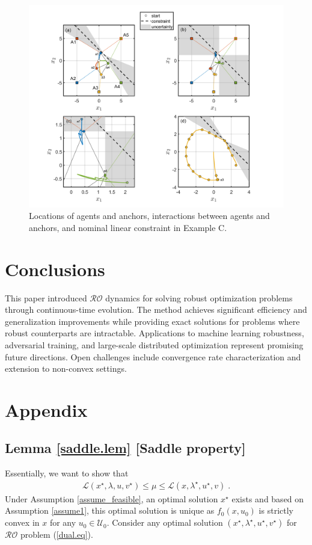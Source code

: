 \documentclass[journal,twoside,web]{ieeecolor}
\newcommand{\rev}[1]{\textcolor{revisionblue}{#1}}
\begin{document}
\begin{figure}
\begin{center}
\includegraphics[scale=0.26]{simulation_figure_finalv3.png}
\vspace{-1.5mm}
\caption{\rev{Locations of agents and anchors, interactions between agents and anchors, and nominal linear constraint in Example C.}}
\label{fig_points}
\end{center}
\end{figure}

\section{Conclusions}\label{section_conclusions}


\rev{This paper introduced $\mathcal{RO}$ dynamics for solving robust optimization problems through continuous-time evolution. The method achieves significant efficiency and generalization improvements while providing exact solutions for problems where robust counterparts are intractable. Applications to machine learning robustness, adversarial training, and large-scale distributed optimization represent promising future directions. Open challenges include convergence rate characterization and extension to non-convex settings.}
\section{Appendix} \label{section_appendix}

\subsection{Lemma \ref{saddle.lem} [Saddle property]}
Essentially, we want to show that
\begin{align*}
\mathcal{L}(x^\star,\lambda,u,v^\star)\leq \mu \leq \mathcal{L}(x,\lambda^\star,u^\star,v)\;.
\end{align*}
Under Assumption \ref{assume_feasible}, an optimal solution $x^\star$ exists and based on Assumption \ref{assume1}, this optimal solution is unique as $f_0(x,u_0)$ is strictly convex in $x$ for any $u_0 \in\mathcal{U}_0$. Consider any optimal solution $(x^\star,\lambda^\star,u^\star,v^\star)$ for $\mathcal{RO}$ problem (\ref{dual.eq}).
\end{document}
